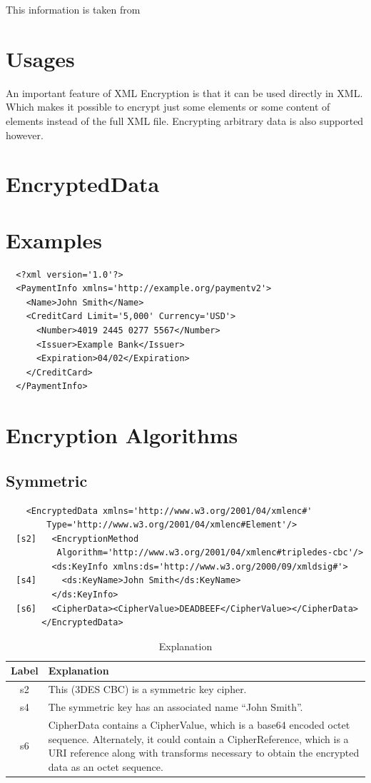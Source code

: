 This information is taken from~\cite{w3c_xml_encryption}
\section{Usages}
An important feature of XML Encryption is that it can be used directly in XML\@.
Which makes it possible to encrypt just some elements or some content of
elements instead of the full XML file. Encrypting arbitrary data is also
supported however.
\section{EncryptedData}
\section{Examples}
\begin{verbatim}
  <?xml version='1.0'?>
  <PaymentInfo xmlns='http://example.org/paymentv2'>
    <Name>John Smith</Name>
    <CreditCard Limit='5,000' Currency='USD'>
      <Number>4019 2445 0277 5567</Number>
      <Issuer>Example Bank</Issuer>
      <Expiration>04/02</Expiration>
    </CreditCard>
  </PaymentInfo>
\end{verbatim}
\section{Encryption Algorithms}
\subsection{Symmetric}
\begin{verbatim}
    <EncryptedData xmlns='http://www.w3.org/2001/04/xmlenc#'
        Type='http://www.w3.org/2001/04/xmlenc#Element'/>
  [s2]   <EncryptionMethod
          Algorithm='http://www.w3.org/2001/04/xmlenc#tripledes-cbc'/>
         <ds:KeyInfo xmlns:ds='http://www.w3.org/2000/09/xmldsig#'>
  [s4]     <ds:KeyName>John Smith</ds:KeyName>
         </ds:KeyInfo>
  [s6]   <CipherData><CipherValue>DEADBEEF</CipherValue></CipherData>
       </EncryptedData>
\end{verbatim}

\begin{table}
    \begin{tabulary}{\textwidth}{cL}
        \toprule
        Label & Explanation \\
        \midrule
        s2 & This (3DES CBC) is a symmetric key cipher. \\

        s4 & The symmetric key has an associated name “John Smith”. \\

        s6 & CipherData contains a CipherValue, which is a base64 encoded octet
        sequence. Alternately, it could contain a CipherReference, which is a
        URI reference along with transforms necessary to obtain the encrypted
        data as an octet sequence. \\
        \bottomrule
    \end{tabulary}
    \caption{Explanation}
\end{table}

